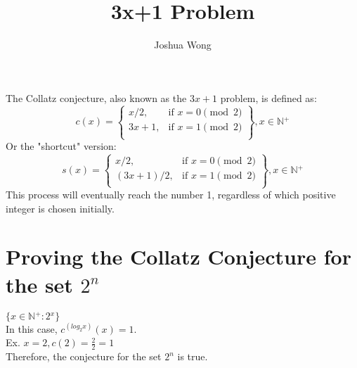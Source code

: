 \documentclass[a4paper,10pt]{article}
\title{3x+1 Problem}
\author{Joshua Wong}
\begin{document}
\maketitle
  The Collatz conjecture, also known as the \(3x+1\) problem, is defined as:
  \[
    c(x) = \left.
    \begin{cases}
        x/2, & \text{if } x = 0 {\pmod {2}}\\
        3x+1, & \text{if } x = 1 {\pmod {2}} \\
        \end{cases}
    \right\}, x \in \mathbb{N{^+}}
  \]
  Or the "shortcut" version:
  \[
    s(x) = \left.
    \begin{cases}
        x/2, & \text{if } x = 0 {\pmod {2}}\\
        (3x+1)/2, & \text{if } x = 1 {\pmod {2}} \\
        \end{cases}
    \right\}, x \in \mathbb{N{^+}}
  \]
  This process will eventually reach the number 1, regardless of which positive integer is chosen initially.
  \section{Proving the Collatz Conjecture for the set $2^{n}$}
  \(\{x \in \mathbb{N{^+}}: 2{^x}\}\) \\
  In this case, \(c^{(log_2{x})}(x) = 1\). \\
  Ex. \(x = 2, c(2) = \frac{2}{2} = 1\) \\
  Therefore, the conjecture for the set $2^{n}$ is true.
\end{document}

